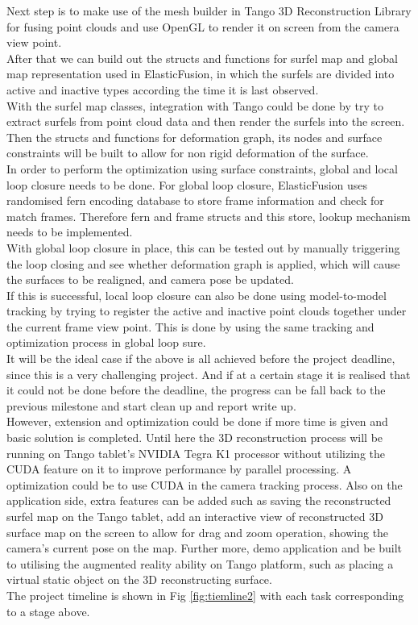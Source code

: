 \documentclass[12pt,twoside]{article}
\begin{document}
Next step is to make use of the mesh builder in Tango 3D Reconstruction Library for fusing point clouds and use OpenGL to render it on screen from the camera view point.\\
After that we can build out the structs and functions for surfel map and global map representation used in ElasticFusion\cite{whelan2016elasticfusion}, in which the surfels are divided into active and inactive types according the time it is last observed.\\
With the surfel map classes, integration with Tango could be done by try to extract surfels from point cloud data and then render the surfels into the screen.\\
Then the structs and functions for deformation graph, its nodes and surface constraints will be built to allow for non rigid deformation of the surface.\\
In order to perform the optimization using surface constraints, global and local loop closure needs to be done. For global loop closure, ElasticFusion\cite{whelan2016elasticfusion} uses randomised fern encoding database to store frame information and check for match frames. Therefore fern and frame structs and this store, lookup mechanism needs to be implemented.\\
With global loop closure in place, this can be tested out by manually triggering the loop closing and see whether deformation graph is applied, which will cause the surfaces to be realigned, and camera pose be updated.\\
If this is successful, local loop closure can also be done using model-to-model tracking by trying to register the active and inactive point clouds together under the current frame view point. This is done by using the same tracking and optimization process in global loop sure.\\
It will be the ideal case if the above is all achieved before the project deadline, since this is a very challenging project. And if at a certain stage it is realised that it could not be done before the deadline, the progress can be fall back to the previous milestone and start clean up and report write up.\\ 
However, extension and optimization could be done if more time is given and basic solution is completed. Until here the 3D reconstruction process will be running on Tango tablet's NVIDIA Tegra K1 processor without utilizing the CUDA feature on it to improve performance by parallel processing. A optimization could be to use CUDA in the camera tracking process. Also on the application side, extra features can be added such as saving the reconstructed surfel map on the Tango tablet, add an interactive view of reconstructed 3D surface map on the screen to allow for drag and zoom operation, showing the camera's current pose on the map. Further more, demo application and be built to utilising the augmented reality ability on Tango platform, such as placing a virtual static object on the 3D reconstructing surface.\\
The project timeline is shown in Fig \ref{fig:tiemline2} with each task corresponding to a stage above.
\end{document}
